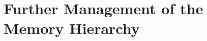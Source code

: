 \documentclass[12pt, a4paper]{article}
\begin{document}
\begin{multicols}{2}
  \end{multicols}

  \section*{Further Management of the Memory Hierarchy}
\end{document}

